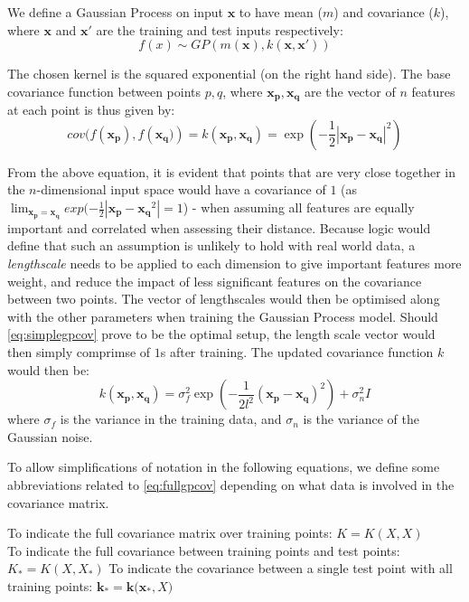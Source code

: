 We define a Gaussian Process on input $\mathbf{x}$ to have mean ($m$) and covariance ($k$), where $\mathbf{x}$ and $\mathbf{x'}$ are the training and test inputs respectively:
\begin{equation}
f(x) \sim GP(m(\mathbf{x}), k(\mathbf{x}, \mathbf{x'}))
\end{equation}

The chosen kernel is the squared exponential (on the right hand side). The base covariance function between points $p, q$, where $\mathbf{x_p, x_q}$ are the vector of $n$ features at each point is thus given by:
\begin{equation}\label{eq:simplegpcov}
    cov(f(\mathbf{x_p}), f(\mathbf{x_q)}) = k(\mathbf{x_p, x_q}) = \exp(-\frac{1}{2}|\mathbf{x_p}-\mathbf{x_q}|^2)
\end{equation}

From the above equation, it is evident that points that are very close together in the $n$-dimensional input space would have a covariance of $1$ (as $\lim_{\mathbf{x_p=x_q}} exp(-\frac{1}{2}|\mathbf{x_p-x_q}^2| = 1$) - when assuming all features are equally important and correlated when assessing their distance. Because logic would define that such an assumption is unlikely to hold with real world data, a \textit{lengthscale} needs to be applied to each dimension to give important features more weight, and reduce the impact of less significant features on the covariance between two points. The vector of lengthscales would then be optimised along with the other parameters when training the Gaussian Process model. Should \ref{eq:simplegpcov} prove to be the optimal setup, the length scale vector would then simply comprimse of $1$s after training. The updated covariance function $k$ would then be:
\begin{equation}\label{eq:fullgpcov}
    k\mathbf{(x_p, x_q)} = \sigma^2_f \exp(-\frac{1}{2l^2} (\mathbf{x_p-x_q})^2) + \sigma^2_nI
\end{equation}
where $\sigma_f$ is the variance in the training data, and $\sigma_n$ is the variance of the Gaussian noise. 

To allow simplifications of notation in the following equations, we define some abbreviations related to \autoref{eq:fullgpcov} depending on what data is involved in the covariance matrix. 

To indicate the full covariance matrix over training points: $K = K(X, X)$ \\
To indicate the full covariance between training points and test points: $K_* = K(X, X_*)$
To indicate the covariance between a single test point with all training points: $\mathbf{k_*} = \mathbf{k(x_*}, X)$

